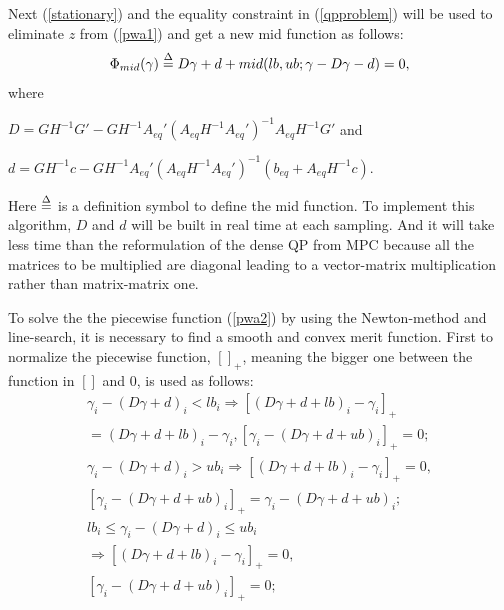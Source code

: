 \documentclass[journal]{IEEEtran}
\begin{document}
Next (\ref{stationary}) and the equality constraint in (\ref{qpproblem}) will be used to eliminate $z$ from (\ref{pwa1}) and get a new mid function as follows:
\begin{equation}\label{pwa2}
{\Phi _{mid}}(\gamma ) \buildrel \Delta \over= D\gamma  + d + mid(lb,ub;\gamma  - D\gamma  - d)=0,
\end{equation}
where

$D = G{H^{ - 1}}G' - G{H^{ - 1}}{A_{eq}'}{({A_{eq}}{H^{ - 1}}{A_{eq}'})^{ - 1}}{A_{eq}}{H^{ - 1}}G'$
and

$d = G{H^{ - 1}}c - G{H^{ - 1}}{A_{eq}'}{({A_{eq}}{H^{ - 1}}{A_{eq}'})^{ - 1}}({b_{eq}} + {A_{eq}}{H^{ - 1}}c)$.

Here $ \buildrel \Delta \over = $ is a definition symbol to define the mid function. To implement this algorithm, $D$ and $d$ will be built in real time at each sampling. And it will take less time than the reformulation of the dense QP from MPC because all the matrices to be multiplied are diagonal leading to a vector-matrix multiplication rather than matrix-matrix one.

To solve the the piecewise function (\ref{pwa2}) by using the  Newton-method and line-search, it is  necessary to find a smooth and convex merit function. First to normalize the piecewise function, ${[]_ + }$, meaning the bigger one between the function in $[]$ and 0, is used as follows:
\begin{equation}\label{zhongkuohao}
\begin{array}{l}
{\gamma _i} - {\left( {D\gamma  + d} \right)_i} < {lb}_i \Rightarrow {\left[ { {{\left( {D\gamma  + d + lb} \right)}_i} - {\gamma _i}} \right]_ + } \\=  {\left( {D\gamma  + d + lb} \right)_i} - {\gamma _i},{\left[ {{\gamma _i} -  {{\left( {D\gamma  + d + ub} \right)}_i}} \right]_ + } = 0;\\
{\gamma _i} -  {\left( {D\gamma  + d} \right)_i} >  u{b_i} \Rightarrow {\left[ { {{\left( {D\gamma  + d + lb} \right)}_i} - {\gamma _i}} \right]_ + } = 0,\\
{\left[ {{\gamma _i} -  {{\left( {D\gamma  + d + ub} \right)}_i}} \right]_ + }=  {{\gamma _i} -  {{\left( {D\gamma  + d + ub} \right)}_i}} ;\\
l{b_i} \le {\gamma _i} -  {\left( {D\gamma  + d} \right)_i} \le  u{b_i}\\ \Rightarrow {\left[ { {{\left( {D\gamma  + d + lb} \right)}_i} - {\gamma _i}} \right]_ + } = 0,\\
{\left[ {{\gamma _i} - {{\left( {D\gamma  + d + ub} \right)}_i}} \right]_ + } = 0;
\end{array}
\end{equation}
\end{document}

